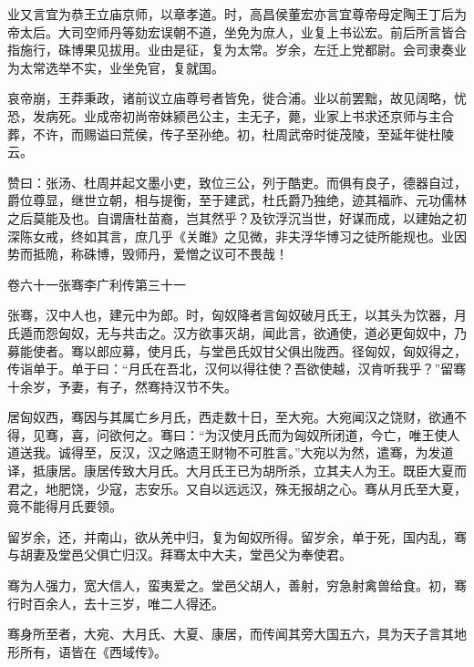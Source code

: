 \documentclass[12pt,UTF8]{ctexbook}
\begin{document}
业又言宜为恭王立庙京师，以章孝道。时，高昌侯董宏亦言宜尊帝母定陶王丁后为帝太后。大司空师丹等劾宏误朝不道，坐免为庶人，业复上书讼宏。前后所言皆合指施行，硃博果见拔用。业由是征，复为太常。岁余，左迁上党都尉。会司隶奏业为太常选举不实，业坐免官，复就国。



哀帝崩，王莽秉政，诸前议立庙尊号者皆免，徙合浦。业以前罢黜，故见阔略，忧恐，发病死。业成帝初尚帝妹颍邑公主，主无子，薨，业家上书求还京师与主合葬，不许，而赐谥曰荒侯，传子至孙绝。初，杜周武帝时徙茂陵，至延年徙杜陵云。



赞曰：张汤、杜周并起文墨小吏，致位三公，列于酷吏。而俱有良子，德器自过，爵位尊显，继世立朝，相与提衡，至于建武，杜氏爵乃独绝，迹其福祚、元功儒林之后莫能及也。自谓唐杜苗裔，岂其然乎？及钦浮沉当世，好谋而成，以建始之初深陈女戒，终如其言，庶几乎《关雎》之见微，非夫浮华博习之徒所能规也。业因势而抵陒，称硃博，毁师丹，爱憎之议可不畏哉！





卷六十一张骞李广利传第三十一



张骞，汉中人也，建元中为郎。时，匈奴降者言匈奴破月氏王，以其头为饮器，月氏遁而怨匈奴，无与共击之。汉方欲事灭胡，闻此言，欲通使，道必更匈奴中，乃募能使者。骞以郎应募，使月氏，与堂邑氏奴甘父俱出陇西。径匈奴，匈奴得之，传诣单于。单于曰：“月氏在吾北，汉何以得往使？吾欲使越，汉肯听我乎？”留骞十余岁，予妻，有子，然骞持汉节不失。



居匈奴西，骞因与其属亡乡月氏，西走数十日，至大宛。大宛闻汉之饶财，欲通不得，见骞，喜，问欲何之。骞曰：“为汉使月氏而为匈奴所闭道，今亡，唯王使人道送我。诚得至，反汉，汉之赂遗王财物不可胜言。”大宛以为然，遣骞，为发道译，抵康居。康居传致大月氏。大月氏王已为胡所杀，立其夫人为王。既臣大夏而君之，地肥饶，少寇，志安乐。又自以远远汉，殊无报胡之心。骞从月氏至大夏，竟不能得月氏要领。



留岁余，还，并南山，欲从羌中归，复为匈奴所得。留岁余，单于死，国内乱，骞与胡妻及堂邑父俱亡归汉。拜骞太中大夫，堂邑父为奉使君。



骞为人强力，宽大信人，蛮夷爱之。堂邑父胡人，善射，穷急射禽兽给食。初，骞行时百余人，去十三岁，唯二人得还。



骞身所至者，大宛、大月氏、大夏、康居，而传闻其旁大国五六，具为天子言其地形所有，语皆在《西域传》。
\end{document}
